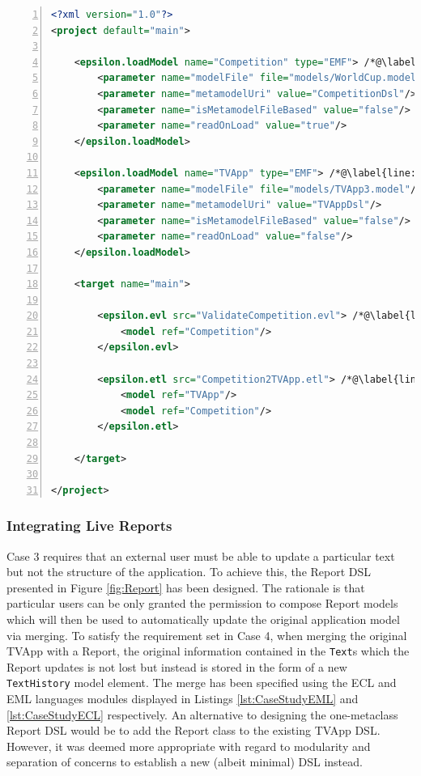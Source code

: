 \begin{lstlisting}[float=tbp, basicstyle=\ttfamily\footnotesize, flexiblecolumns=true, numbers=left, nolol=true, caption=Workflow that integrates the validation and transformation steps, label=lst:TransformCompetitionWorkflow, language=XML, tabsize=2]
<?xml version="1.0"?>
<project default="main">
	
	<epsilon.loadModel name="Competition" type="EMF"> /*@\label{line:LoadCompetitionTask}@*/
		<parameter name="modelFile" file="models/WorldCup.model"/>
		<parameter name="metamodelUri" value="CompetitionDsl"/>
		<parameter name="isMetamodelFileBased" value="false"/>
		<parameter name="readOnLoad" value="true"/>
	</epsilon.loadModel>
	
	<epsilon.loadModel name="TVApp" type="EMF"> /*@\label{line:LoadTVAppTask}@*/
		<parameter name="modelFile" file="models/TVApp3.model"/>
		<parameter name="metamodelUri" value="TVAppDsl"/>
		<parameter name="isMetamodelFileBased" value="false"/>
		<parameter name="readOnLoad" value="false"/>
	</epsilon.loadModel>

	<target name="main">

		<epsilon.evl src="ValidateCompetition.evl"> /*@\label{line:ValidateCompetitionTask}@*/
			<model ref="Competition"/>
		</epsilon.evl>		
		
		<epsilon.etl src="Competition2TVApp.etl"> /*@\label{line:TransformCompetitionTask}@*/
			<model ref="TVApp"/>
			<model ref="Competition"/>
		</epsilon.etl>
		
	</target>
	
</project>
\end{lstlisting}

\subsubsection{Integrating Live Reports}
\label{sec:LiveReports}

Case 3 requires that an external user must be able to update a particular text but not the structure of the application. To achieve this, the Report DSL presented in Figure \ref{fig:Report} has been designed. The rationale is that particular users can be only granted the permission to compose Report models which will then be used to automatically update the original application model via merging. To satisfy the requirement set in Case 4, when merging the original TVApp with a Report, the original information contained in the \texttt{Text}s which the Report updates is not lost but instead is stored in the form of a new \texttt{TextHistory} model element. The merge has been specified using the ECL and EML languages modules displayed in Listings \ref{lst:CaseStudyEML} and \ref{lst:CaseStudyECL} respectively. An alternative to designing the one-metaclass Report DSL would be to add the Report class to the existing TVApp DSL. However, it was deemed more appropriate with regard to modularity and separation of concerns to establish a new (albeit minimal) DSL instead.

